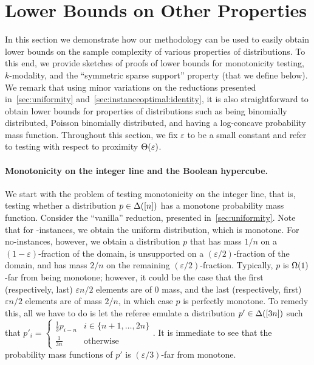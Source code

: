 \documentclass[11pt]{article}
\theoremstyle{remark}   	\newtheorem{remark}[theorem]{Remark}
\theoremstyle{definition}   	\newaliascnt{defn}{theorem}
\newcommand{\eps}{\ensuremath{\varepsilon}\xspace}
\newcommand{\no}{{\sf{}no}\xspace}
\newcommand{\bigTheta}[1]{{\Theta\mleft( #1 \mright)}}
\newcommand{\bigOmega}[1]{{\Omega\mleft( #1 \mright)}}
\begin{document}
\section{Lower Bounds on Other Properties}\label{sec:other}
In this section we demonstrate how our methodology can be used to easily obtain lower bounds on the sample complexity of various properties of distributions. To this end, we provide sketches of proofs of lower bounds for monotonicity testing, $k$-modality, and the ``symmetric sparse support'' property (that we define below). We remark that using minor variations on the reductions presented in~\autoref{sec:uniformity} and~\autoref{sec:instanceoptimal:identity}, it is also straightforward to obtain lower bounds for properties of distributions such as being binomially distributed, Poisson binomially distributed, and having a log-concave probability mass function. Throughout this section, we fix $\eps$ to be a small constant and refer to testing with respect to proximity $\bigTheta{\eps}$.

\paragraph{Monotonicity on the integer line and the Boolean hypercube.} We start with the problem of testing monotonicity on the integer line, that is, testing whether a distribution $p\in\Delta\!\left([n]\right)$ has a monotone probability mass function. Consider the ``vanilla'' reduction, presented in~\autoref{sec:uniformity}. Note that for \yes-instances, we obtain the uniform distribution, which is monotone. For \no-instances, however, we obtain a distribution $p$ that has mass $1/n$ on a $(1-\eps)$-fraction of the domain, is unsupported on a $(\eps/2)$-fraction of the domain, and has mass $2/n$ on the remaining $(\eps/2)$-fraction. Typically, $p$ is $\bigOmega{1}$-far from being monotone; however, it could be the case that the first (respectively, last) $\eps n / 2$ elements are of $0$ mass, and the last (respectively, first) $\eps n / 2$ elements are of mass $2/n$, in which case $p$ is perfectly monotone. To remedy this, all we have to do is let the referee emulate a distribution $p'\in\Delta\!\left([3n]\right)$ such that 
$p'_i = \begin{cases}
	\frac{1}{3}p_{i-n} & i\in\{n+1, \ldots, 2n\} \\
	\frac{1}{3n} & \text{otherwise}
 \end{cases}$. It is immediate to see that the probability mass functions of $p'$ is $(\eps/3)$-far from monotone.
 
\end{document}
